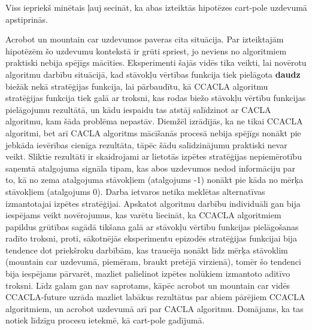 \documentclass{ludis} %
\begin{document}
Viss iepriekš minētais ļauj secināt, ka abas izteiktās hipotēzes cart-pole
uzdevumā apstiprinās.

Acrobot un mountain car uzdevumos paveras cita situācija. Par izteiktajām
hipotēzēm šo uzdevumu kontekstā ir grūti spriest, jo neviens no algoritmiem
praktiski nebija spējīgs mācīties. Eksperimenti šajās vidēs tika veikti, lai
novērotu algoritmu darbību situācijā, kad stāvokļu vērtības funkcija tiek
pielāgota \textbf{daudz} biežāk nekā stratēģijas funkcija, lai pārbaudītu, kā
CCACLA algoritmu stratēģijas funkcija tiek galā ar troksni, kas rodas biežo
stāvokļu vērtību funkcijas pielāgojumu rezultātā, un kādu iespaidu tas atstāj
salīdzinot ar CACLA algoritmu, kam šāda problēma nepastāv. Diemžēl izrādījās, ka
ne tikai CCACLA algoritmi, bet arī CACLA algoritms mācīšanās procesā nebija
spējīgs nonākt pie jebkāda ievērības cienīga rezultāta, tāpēc šādu salīdzinājumu
praktiski nevar veikt. Sliktie rezultāti ir skaidrojami ar lietotās izpētes
stratēģijas nepiemērotību saņemtā atalgojuma signāla tipam, kas abos uzdevumos
nedod informāciju par to, kā no zema atalgojuma stāvokļiem (atalgojums -1)
nonākt pie kāda no mērķa stāvokļiem (atalgojums 0). Darba ietvaros netika
meklētas alternatīvas izmantotajai izpētes stratēģijai. Apskatot algoritmu
darbību individuāli gan bija iespējams veikt novērojumus, kas varētu liecināt,
ka CCACLA algoritmiem papildus grūtības sagādā tikšana galā ar stāvokļu vērtību
funkcijas pielāgošanas radīto troksni, proti, sākotnējās eksperimentu epizodēs
stratēģijas funkcijai bija tendence dot priekšroku darbībām, kas traucēja nonākt
līdz mērķa stāvoklim (mountain car uzdevumā, piemēram, braukt pretējā virzienā),
tomēr šo tendenci bija iespējams pārvarēt, mazliet palielinot izpētes nolūkiem
izmantoto aditīvo troksni. Līdz galam gan nav saprotams, kāpēc acrobot un
mountain car vidēs CCACLA-future uzrāda mazliet labākus rezultātus par abiem
pārējiem CCACLA algoritmiem, un acrobot uzdevumā arī par CACLA algoritmu.
Domājams, ka tas notiek līdzīgu procesu ietekmē, kā cart-pole gadījumā.




\end{document}
